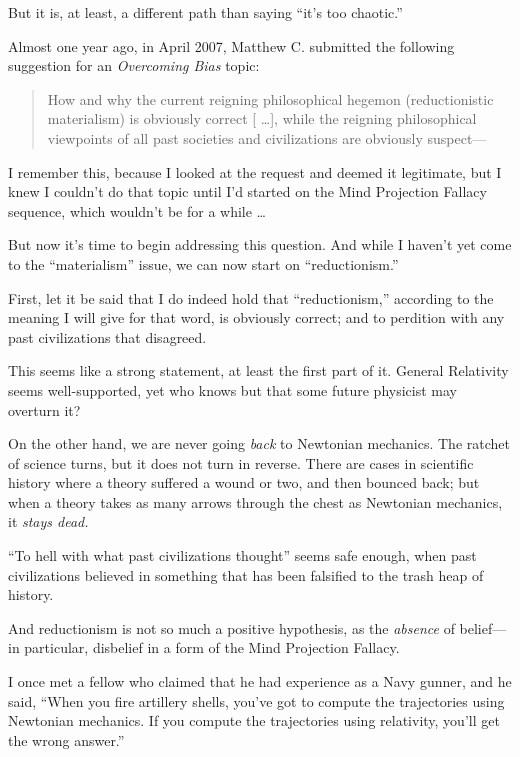 {
 But it is, at least, a different path than saying
``it's too
chaotic.''}

\myendsectiontext


{
 Almost one year ago, in April 2007, Matthew C. submitted the
following suggestion for an \textit{Overcoming Bias} topic:}

\begin{quote}
{
 How and why the current reigning philosophical hegemon
(reductionistic materialism) is obviously correct [ \ldots ], while the
reigning philosophical viewpoints of all past societies and
civilizations are obviously suspect---}
\end{quote}

{
 I remember this, because I looked at the request and deemed it
legitimate, but I knew I couldn't do that topic until
I'd started on the Mind Projection Fallacy sequence,
which wouldn't be for a while \ldots}

{
 But now it's time to begin addressing this
question. And while I haven't yet come to the
``materialism'' issue, we can now
start on ``reductionism.''}

{
 First, let it be said that I do indeed hold that
``reductionism,'' according to the
meaning I will give for that word, is obviously correct; and to
perdition with any past civilizations that disagreed.}

{
 This seems like a strong statement, at least the first part of it.
General Relativity seems well-supported, yet who knows but that some
future physicist may overturn it?}

{
 On the other hand, we are never going \textit{back} to Newtonian
mechanics. The ratchet of science turns, but it does not turn in
reverse. There are cases in scientific history where a theory suffered
a wound or two, and then bounced back; but when a theory takes as many
arrows through the chest as Newtonian mechanics, it \textit{stays
dead.}}

{
 ``To hell with what past civilizations
thought'' seems safe enough, when past civilizations
believed in something that has been falsified to the trash heap of
history.}

{
 And reductionism is not so much a positive hypothesis, as the
\textit{absence} of belief---in particular, disbelief in a form of the
Mind Projection Fallacy.}

{
 I once met a fellow who claimed that he had experience as a Navy
gunner, and he said, ``When you fire artillery shells,
you've got to compute the trajectories using Newtonian
mechanics. If you compute the trajectories using relativity,
you'll get the wrong answer.''}

